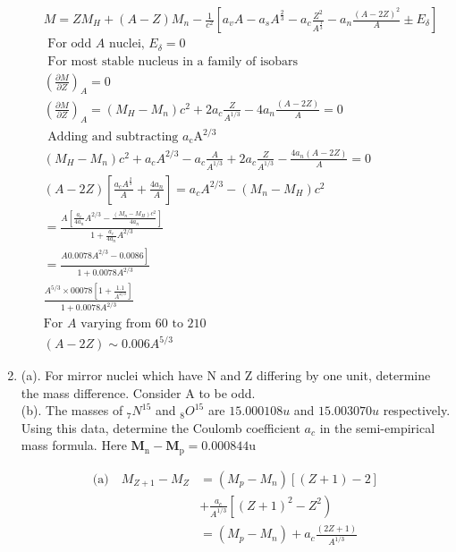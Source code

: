 \begin{enumerate}
\begin{answer}
	\begin{align*}
&	M=Z M_H+(A-Z) M_n-\frac{1}{c^2}\left[a_v A-a_s A^{\frac{2}{3}}-a_c \frac{Z^2}{A^{\frac{1}{3}}}-a_n \frac{(A-2 Z)^2}{A} \pm E_\delta\right]\\
&\text{	For odd $A$ nuclei, $E_\delta=0$}\\
&\text{	For most stable nucleus in a family of isobars}\\
&\left(\frac{\partial M}{\partial Z}\right)_A=0\\
&\left(\frac{\partial M}{\partial Z}\right)_A=\left(M_H-M_n\right) c^2+2 a_{c} \frac{Z}{A^{1/3}}-4 a_n \frac{\left(A-2 Z\right)}{A}=0\\
&\text { Adding and subtracting } {a}_{\mathrm{c}} \mathrm{A}^{2 / 3}\\
&\left(M_H-M_n\right) c^2+a_{c} A^{2 / 3}-a_c \frac{A}{A^{1/3}}+2 a_{c} \frac{Z}{A^{1/3}}-\frac{4 a_n(A-2 Z)}{A}=0\\
&(A-2 Z)\left[\frac{a_c A^{\frac{2}{3}}}{A}+\frac{4 a_n}{A}\right]=a_c A^{2 / 3}-\left(M_n-M_H\right) c^2\\
&=\frac{A\left[\frac{a_c}{4 a_n} A^{2 / 3}-\frac{\left(M_n-M_H\right) c^2}{4 a_n}\right]}{1+\frac{a_c}{4 a_n} A^{2 / 3}}\\
&=\frac{\left.A 0.0078 A^{2 / 3}-0.0086\right]}{1+0.0078 A^{2 / 3}}\\
&\frac{A^{5 / 3} \times 00078\left[1+\frac{1.1}{A^{2 / 3}}\right]}{1+0.0078 A^{2 / 3}}\\
&\text{For $A$ varying from 60 to 210}\\
&(A-2 Z) \sim 0.006 A^{5 / 3}
	\end{align*}
\end{answer}
\item  (a). For mirror nuclei which have $\mathrm{N}$ and $\mathrm{Z}$ differing by one unit, determine the mass difference. Consider A to be odd.\\
(b). The masses of ${ }_7 N^{15}$ and ${ }_8 O^{15}$ are $15.000108 u$ and $15.003070 u$ respectively. Using this data, determine the Coulomb coefficient $a_c$ in the semi-empirical mass formula. Here $\mathbf{M}_{\mathrm{n}}-\mathbf{M}_{\mathrm{p}}=0.000844 \mathrm{u}$
\begin{answer}
	\begin{align*}
	\text{(a)}\quad M_{Z+1}-M_Z&=\left(M_p-M_n\right)[(Z+1)-2]\\
	&+\frac{a_c}{A^{1 / 3}}\left[(Z+1)^2-Z^2\right)\\
	&=\left(M_p-M_n\right)+a_c \frac{(2Z+1)}{A^{1 / 3}}\\

\end{align*}
\end{answer}
\end{enumerate}
